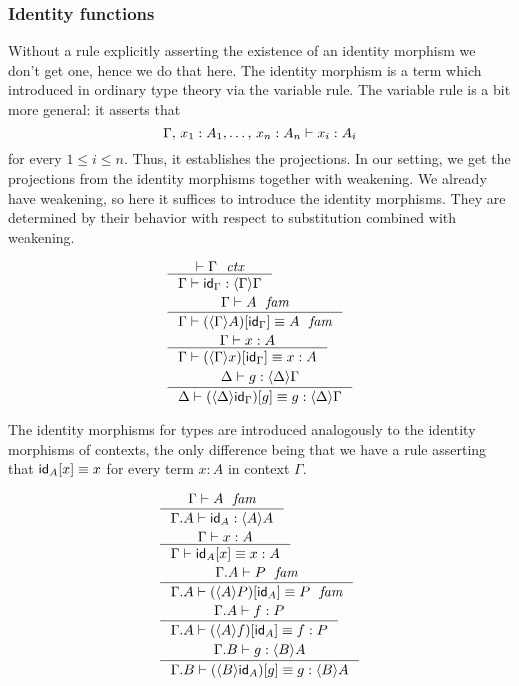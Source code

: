 \subsubsection{Identity functions}
Without a rule explicitly asserting the existence of an identity morphism we don't
get one, hence we do that here. The identity morphism is a term which introduced
in ordinary type theory via the variable rule. The variable rule is a bit more
general: it asserts that
\begin{equation*}
\jterm{\Gamma,\,x_1:A_1,\ldots,\,x_n:A_n}{A_i}{x_i}
\end{equation*}
for every $1\leq i\leq n$. Thus, it establishes the projections. In our setting,
we get the projections from the identity morphisms together with weakening. We
already have weakening, so here it suffices to introduce the identity morphisms.
They are determined by their behavior with respect to substitution combined with
weakening.

\begin{align}
&\inference{\jctx{\Gamma}}{\jterm{\Gamma}{\ctxwk{\Gamma}{\Gamma}}{\idfunc[\Gamma]}}\label{ctxIdFuncForm}\\
&\inference{\jfam{\Gamma}{A}}{\jfameq{\Gamma}{\subst{\idfunc[\Gamma]}{\ctxwk{\Gamma}{A}}}{A}}\label{ctxIdFuncPbInvType}\\
&\inference{\jterm{\Gamma}{A}{x}}{\jtermeq{\Gamma}{A}{\subst{\idfunc[\Gamma]}{\ctxwk{\Gamma}{x}}}{x}}\label{ctxIdFuncPbInvTerm}\\
&\inference{\jterm{\Delta}{\ctxwk{\Delta}{\Gamma}}{g}}{\jtermeq{\Delta}{\ctxwk{\Delta}{\Gamma}}{\subst{g}{\ctxwk{\Delta}{\idfunc[\Gamma]}}}{g}}\label{ctxIdFuncSubstInvTerm}
\end{align}

The identity morphisms for types are introduced analogously to the identity
morphisms of contexts, the only difference being that we have a rule asserting
that $\subst{x}{\idfunc[A]}\jdeq x$ for every term $x:A$ in context $\Gamma$.

\begin{align}
& \inference{\jfam{\Gamma}{A}}{\jterm{\ctxext{\Gamma}{A}}{\ctxwk{A}{A}}{\idfunc[A]}}\\
& \inference{\jterm{\Gamma}{A}{x}}{\jtermeq{\Gamma}{A}{\subst{x}{\idfunc[A]}}{x}}\\
& \inference{\jfam{\ctxext{\Gamma}{A}}{P}}{\jfameq{\ctxext{\Gamma}{A}}{\subst{\idfunc[A]}{\ctxwk{A}{P}}}{P}}\\
& \inference{\jterm{\ctxext{\Gamma}{A}}{P}{f}}{\jtermeq{\ctxext{\Gamma}{A}}{P}{\subst{\idfunc[A]}{\ctxwk{A}{f}}}{f}} \\
& \inference{\jterm{\ctxext{\Gamma}{B}}{\ctxwk{B}{A}}{g}}{\jtermeq{\ctxext{\Gamma}{B}}{\ctxwk{B}{A}}{\subst{g}{\ctxwk{B}{\idfunc[A]}}}{g}}
\end{align}

